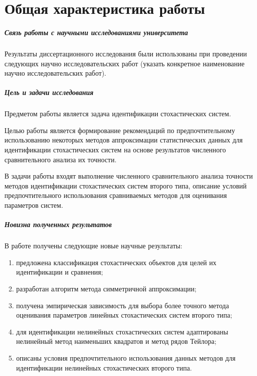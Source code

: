 \chapter*{Общая характеристика работы}

{\color{red}
\paragraph{Связь работы с научными исследованиями университета}
Результаты диссертационного исследования были использованы при
проведении следующих научно исследовательских работ (указать
конкретное наименование научно исследовательских работ).

\paragraph{Цель и задачи исследования}
Предметом работы является задача идентификации стохастических систем.

Целью работы является формирование рекомендаций по предпочтительному использованию
некоторых методов аппроксимации статистических данных для идентификации
стохастических систем на основе результатов численного сравнительного
анализа их точности.

В задачи работы входят выполнение численного сравнительного анализа
точности методов идентификации стохастических систем второго типа,
описание условий предпочтительного использования сравниваемых методов
для оценивания параметров систем.

\paragraph{Новизна полученных результатов}

В работе получены следующие новые научные результаты:
\begin{enumerate}
\item предложена классификация стохастических объектов для целей их идентификации и сравнения;
\item разработан алгоритм метода симметричной аппроксимации;
\item получена эмпирическая зависимость для выбора более точного метода
  оценивания параметров линейных стохастических систем второго типа;
\item для идентификации нелинейных стохастических систем
  адаптированы нелинейный метод наименьших квадратов и метод рядов Тейлора;
\item описаны условия предпочтительного использования данных
  методов для идентификации нелинейных стохастических второго типа.
\end{enumerate}

}
